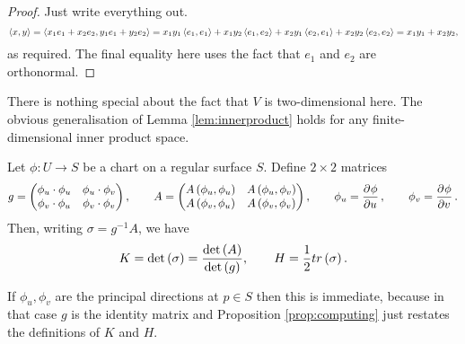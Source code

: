 \begin{proof}
Just write everything out.
$$ \left\langle x, y \right\rangle = \left\langle x_1e_1 + x_2e_2, y_1e_1 + y_2e_2 \right\rangle = x_1y_1\left\langle e_1, e_1 \right\rangle + x_1y_2\left\langle e_1, e_2 \right\rangle + x_2y_1\left\langle e_2, e_1 \right\rangle + x_2y_2\left\langle e_2, e_2 \right\rangle = x_1y_1 + x_2y_2, $$
as required. The final equality here uses the fact that $ e_1 $ and $ e_2 $ are orthonormal.
\end{proof}

\begin{remark*}
There is nothing special about the fact that $ V $ is two-dimensional here. The obvious generalisation of Lemma \ref{lem:innerproduct} holds for any finite-dimensional inner product space.
\end{remark*}

\begin{proposition}
\label{prop:computing}
Let $ \phi : U \to S $ be a chart on a regular surface $ S $. Define $ 2 \times 2 $ matrices
$$ g = \twobytwo{\phi_u \cdot \phi_u}{\phi_u \cdot \phi_v}{\phi_v \cdot \phi_u}{\phi_v \cdot \phi_v}, \qquad A = \twobytwo{A\br{\phi_u, \phi_u}}{A\br{\phi_u, \phi_v}}{A\br{\phi_v, \phi_u}}{A\br{\phi_v, \phi_v}}, \qquad \phi_u = \dpd{\phi}{u}, \qquad \phi_v = \dpd{\phi}{v}. $$
Then, writing $ \sigma = g^{-1}A $, we have
$$ K = \det\br{\sigma} = \dfrac{\det\br{A}}{\det\br{g}}, \qquad H = \dfrac{1}{2}tr\br{\sigma}. $$
\end{proposition}

\begin{remark*}
If $ \phi_u, \phi_v $ are the principal directions at $ p \in S $ then this is immediate, because in that case $ g $ is the identity matrix and Proposition \ref{prop:computing} just restates the definitions of $ K $ and $ H $.
\end{remark*}

\pagebreak

